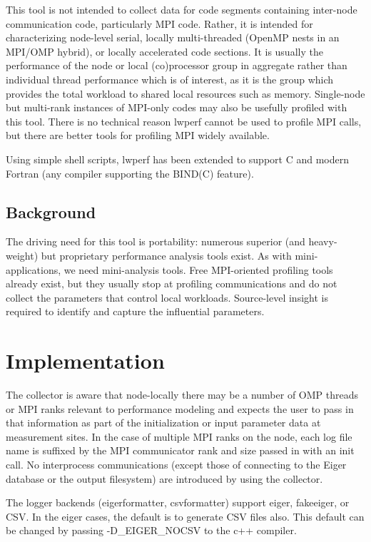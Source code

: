 \documentclass{article}
\begin{document}
This tool is not intended to collect data for code segments containing inter-node communication code, particularly MPI code. Rather, it is intended for characterizing node-level serial, locally multi-threaded (OpenMP nests in an MPI/OMP hybrid), or locally accelerated code sections. It is usually the performance of the node or local (co)processor group in aggregate rather than individual thread performance which is of interest, as it is the group which provides the total workload to shared local resources such as memory. Single-node but multi-rank instances of MPI-only codes may also be usefully profiled with this tool. There is no technical reason lwperf cannot be used to profile MPI calls, but there are better tools for profiling MPI widely available.

Using simple shell scripts, lwperf has been extended to support C and modern Fortran (any compiler supporting the BIND(C) feature).

\subsection{Background}
The driving need for this tool is portability: numerous superior (and heavy-weight) but proprietary performance analysis tools exist. As with mini-applications, we need mini-analysis tools.
Free MPI-oriented profiling tools already exist, but they usually stop at profiling communications and do not collect the parameters that control local workloads. Source-level insight is required to identify and capture the influential parameters.

\section{Implementation}
\label{sec:impl}
 The collector is aware that node-locally there may be a number of OMP threads or MPI ranks relevant to performance modeling and expects the user to pass in that information as part of the initialization or input parameter data at measurement sites. In the case of multiple MPI ranks on the node, each log file name is suffixed by the MPI communicator rank and size passed in with an init call. No interprocess communications (except those of connecting to the Eiger database or the output filesystem) are introduced by using the collector.

The logger backends (eigerformatter, csvformatter) support eiger, fakeeiger, or CSV. In the eiger cases, the default is to generate CSV files also. This default can be changed by passing -D\_EIGER\_NOCSV to the c++ compiler.
\end{document}
